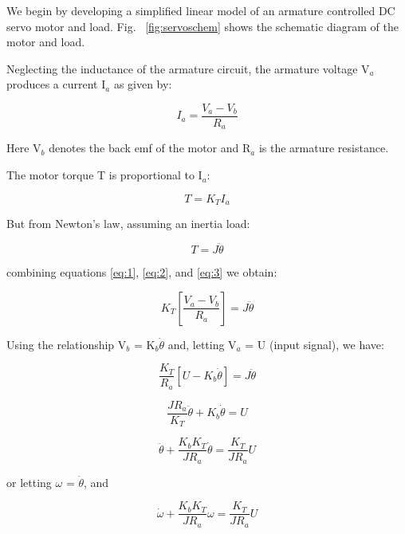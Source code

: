\documentclass[11pt,a4paper]{article}
\begin{document}
We begin by developing a simplified linear model of an armature controlled DC servo motor and load. Fig. ~\ref{fig:servoschem} shows the schematic diagram of the motor and load.

Neglecting the inductance of the armature circuit, the armature voltage V$_{a}$ produces a current I$_{a}$ as given by:

\begin{equation} \label{eq:1}
I_{a} = \frac{V_{a}-V_{b}}{R_{a}}
\end{equation}

Here V$_{b}$ denotes the back emf of the motor and R$_{a}$ is the armature resistance.

The motor torque T is proportional to I$_{a}$:

\begin{equation} \label{eq:2}
T = K_{T}I_{a}
\end{equation}

But from Newton's law, assuming an inertia load:

\begin{equation} \label{eq:3}
T = J\ddot{\theta}
\end{equation}

combining equations \ref{eq:1}, \ref{eq:2}, and \ref{eq:3} we obtain:

\begin{equation} \label{eq:4}
K_{T}\left[\frac{V_{a}-V_{b}}{R_{a}}\right] = J\ddot{\theta}
\end{equation} 

Using the relationship V$_{b}$ = K$_{b}\dot{\theta}$ and, letting V$_{a}$ = U (input signal), we have:

\begin{equation} \label{eq:5}
\frac{K_{T}}{R_{a}}\left[U-K_{b}\dot{\theta}\right] = J\ddot{\theta}
\end{equation}

\begin{equation} \label{eq:6}
\frac{JR_{a}}{K_{T}}\ddot{\theta}+ K_{b}\dot{\theta} = U
\end{equation}

\begin{equation} \label{eq:7}
\ddot{\theta} + \frac{K_{b}K_{T}}{JR_{a}}\dot{\theta} = \frac{K_{T}}{JR_{a}}U
\end{equation}

or letting $\omega$ = $\dot{\theta}$, and 

\begin{equation} \label{eq:8}
\dot{\omega} + \frac{K_{b}K_{T}}{JR_{a}}\omega = \frac{K_{T}}{JR_{a}}U
\end{equation}
\end{document}
